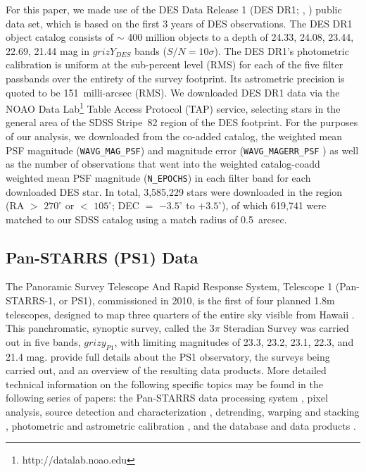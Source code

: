 \documentclass[fleqn,usenatbib]{mnras}
\begin{document}
For this paper, we made use of the DES Data Release 1 (DES DR1; \citealt{Morg2018}, \citealt{2018ApJS..239...18A}) public data set, which is based on the first 3 years of DES observations.  The DES DR1 object catalog consists of $\sim$ 400 million objects to a depth of 24.33, 24.08, 23.44, 22.69, 21.44 mag in $grizY_{DES}$ bands ($S/N=10\sigma$).  The DES DR1's photometric calibration is uniform at the sub-percent level (RMS) for each of the five filter passbands over the entirety of the survey footprint.  Its astrometric precision is quoted to be 151~milli-arcsec (RMS).  We downloaded DES DR1 data via the NOAO
Data Lab\footnote{http://datalab.noao.edu} Table Access Protocol (TAP) service, selecting stars in the general area of the SDSS Stripe~82 region of the DES footprint.  For the purposes of our analysis, we downloaded from the co-added catalog, the weighted mean PSF magnitude ({\tt WAVG\_MAG\_PSF}) and magnitude error ({\tt WAVG\_MAGERR\_PSF} ) as well as the number of observations that went into the weighted catalog-coadd weighted mean PSF magnitude ({\tt N\_EPOCHS}) in each filter band for each downloaded DES star.  In total, 3,585,229 stars were downloaded in the region (RA $>$ $270^{\circ}$ or $<$  $105^{\circ}$; DEC $=$ $-3.5^{\circ}$ to $+3.5^{\circ}$), of which 619,741 were matched to our SDSS catalog using a match radius of 0.5~arcsec.


\subsection{Pan-STARRS (PS1) Data} \label{ssec:ps1}
 
The Panoramic Survey Telescope And Rapid Response System, Telescope 1 (Pan-STARRS-1, or PS1), commissioned 
in 2010, is the first of four planned 1.8m telescopes, designed to map three quarters of the entire sky visible from 
Hawaii \citep{2010SPIE.7733E..0EK}. This panchromatic, synoptic survey, called the 3$\pi$ Steradian Survey was 
carried out in five bands, $grizy_{P1}$, with limiting magnitudes of 23.3, 23.2, 23.1, 22.3, and 21.4 mag. 
\citet{2016arXiv161205560C} provide full details about the PS1 observatory, the surveys being carried out, and an overview of the resulting data products. More detailed technical information on the following specific topics may be found in the following series of papers: the Pan-STARRS data processing system \citep{Euge20a}, pixel analysis, source detection and characterization \citep{Euge20b}, detrending, warping and stacking \citep{Wate2020}, photometric and astrometric calibration \citep{Euge20c}, and the database and data products \citep{Flew2020}. 
\end{document}
